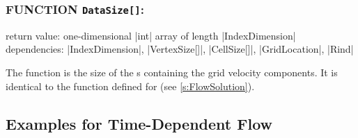 \subsubsection*{FUNCTION \texttt{DataSize[]}:}

\noindent return value: one-dimensional |int| array of length
          |IndexDimension| \\
\noindent dependencies: |IndexDimension|, |VertexSize[]|, |CellSize[]|,
          |GridLocation|, |Rind|

The function  is the size of the s
containing the grid velocity components.
It is identical to the function  defined for
 (see \autoref{s:FlowSolution}).

\subsection{Examples for Time-Dependent Flow}
\label{s:Examplestimedep}

